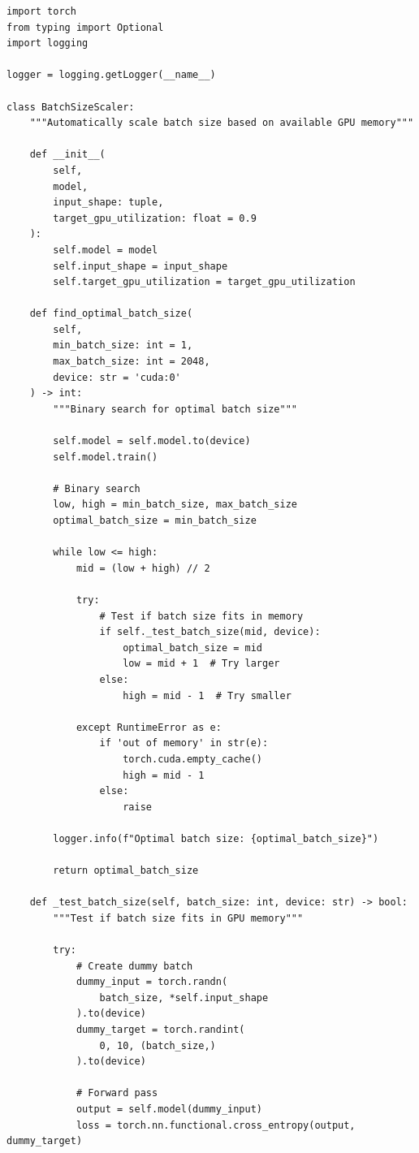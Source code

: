 \begin{lstlisting}[style=python, caption=Automatic Batch Size Scaling]
import torch
from typing import Optional
import logging

logger = logging.getLogger(__name__)

class BatchSizeScaler:
    """Automatically scale batch size based on available GPU memory"""

    def __init__(
        self,
        model,
        input_shape: tuple,
        target_gpu_utilization: float = 0.9
    ):
        self.model = model
        self.input_shape = input_shape
        self.target_gpu_utilization = target_gpu_utilization

    def find_optimal_batch_size(
        self,
        min_batch_size: int = 1,
        max_batch_size: int = 2048,
        device: str = 'cuda:0'
    ) -> int:
        """Binary search for optimal batch size"""

        self.model = self.model.to(device)
        self.model.train()

        # Binary search
        low, high = min_batch_size, max_batch_size
        optimal_batch_size = min_batch_size

        while low <= high:
            mid = (low + high) // 2

            try:
                # Test if batch size fits in memory
                if self._test_batch_size(mid, device):
                    optimal_batch_size = mid
                    low = mid + 1  # Try larger
                else:
                    high = mid - 1  # Try smaller

            except RuntimeError as e:
                if 'out of memory' in str(e):
                    torch.cuda.empty_cache()
                    high = mid - 1
                else:
                    raise

        logger.info(f"Optimal batch size: {optimal_batch_size}")

        return optimal_batch_size

    def _test_batch_size(self, batch_size: int, device: str) -> bool:
        """Test if batch size fits in GPU memory"""

        try:
            # Create dummy batch
            dummy_input = torch.randn(
                batch_size, *self.input_shape
            ).to(device)
            dummy_target = torch.randint(
                0, 10, (batch_size,)
            ).to(device)

            # Forward pass
            output = self.model(dummy_input)
            loss = torch.nn.functional.cross_entropy(output, dummy_target)


\end{lstlisting}
